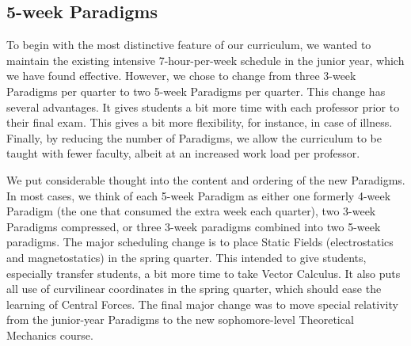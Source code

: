 \documentclass[english,aps,pra,reprint,noshowpacs,superscriptaddress]{revtex4-1}
\begin{document}
\subsection{5-week Paradigms}
To begin with the most distinctive feature of our curriculum, we
wanted to maintain the existing intensive 7-hour-per-week schedule in
the junior year, which we have found effective.  However, we chose to
change from three 3-week Paradigms per quarter to two 5-week Paradigms
per quarter.    This change has several advantages.  It gives students
a bit more time with each professor prior to their final exam.  This
gives a bit more flexibility, for instance, in case of illness.
Finally, by reducing the number of Paradigms, we allow the curriculum
to be taught with fewer faculty, albeit at an increased work load per professor.

We put considerable thought into the content and ordering of the new
Paradigms.  In most cases, we think of each 5-week Paradigm as either
one formerly 4-week Paradigm (the one that consumed the extra week
each quarter), two 3-week Paradigms compressed, or three 3-week paradigms combined into two 5-week paradigms.  The major
scheduling change is to place Static Fields (electrostatics and
magnetostatics) in the spring quarter.  
This intended to give students, especially transfer students, 
a bit more time to take Vector Calculus.  It also puts all use of
curvilinear coordinates in the spring quarter, which should ease the
learning of Central Forces.  The final major change was to move special relativity from the junior-year Paradigms to the new sophomore-level Theoretical Mechanics course.
\end{document}
